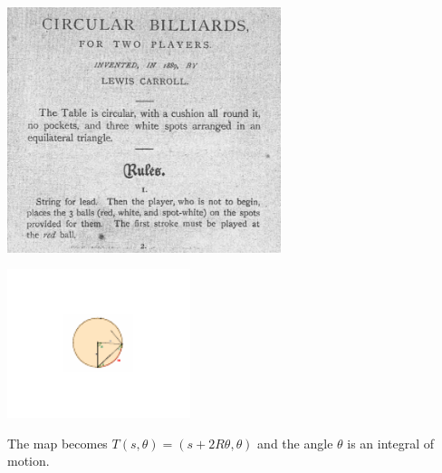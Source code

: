 \documentclass[compress,aspectratio=169,10pt,usenames,dvipsnames]{beamer}
\begin{document}
\begin{frame}
\begin{example}
\begin{center}
\includegraphics[width=0.60\textwidth]{CircularBilliardRulesCarroll1}
\end{center}
\end{example}

\end{frame}


\begin{frame}

\begin{center}
\includegraphics[width=0.4\textwidth]{CircularBilliard}
\end{center}

The map becomes $T(s,\theta) = (s+2R\theta,\theta)$ and the angle $\theta$ is an integral of motion. 

\end{frame}

\end{document}
